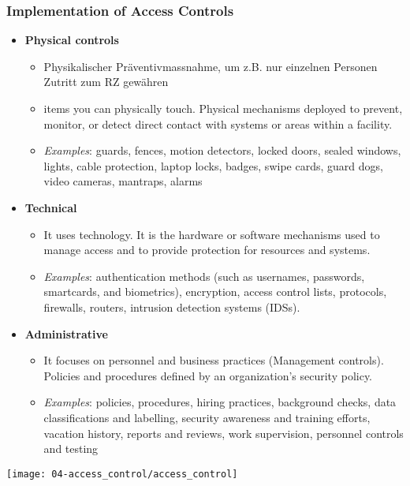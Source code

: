 \subsubsection{Implementation of Access Controls}\label{subsubsec:implementation-of-access-controls}
\begin{itemize}
    \item \textbf{Physical controls}
    \begin{itemize}
        \item Physikalischer Präventivmassnahme, um z.B. nur einzelnen Personen Zutritt zum RZ gewähren
        \item items you can physically touch. Physical mechanisms deployed to prevent, monitor, or detect direct contact with systems or areas within a facility.
        \item \textit{Examples}: guards, fences, motion detectors, locked doors, sealed windows, lights, cable protection, laptop locks, badges, swipe cards, guard dogs, video cameras, mantraps, alarms
    \end{itemize}
    \item \textbf{Technical}
    \begin{itemize}
        \item It uses technology. It is the hardware or software mechanisms used to manage access and to provide protection for resources and systems.
        \item \textit{Examples}: authentication methods (such as usernames, passwords, smartcards, and biometrics), encryption, access control lists, protocols, firewalls, routers, intrusion detection systems (IDSs).
    \end{itemize}
    \item \textbf{Administrative}
    \begin{itemize}
        \item It focuses on personnel and business practices (Management controls). Policies and procedures defined by an organization's security policy.
        \item \textit{Examples}: policies, procedures, hiring practices, background checks, data classifications and labelling, security awareness and training efforts, vacation history, reports and reviews, work supervision, personnel controls and testing
    \end{itemize}
\end{itemize}

\begin{center}
    \texttt{[image: 04-access\_control/access\_control]}
    \vspace{-8pt}
\end{center}


